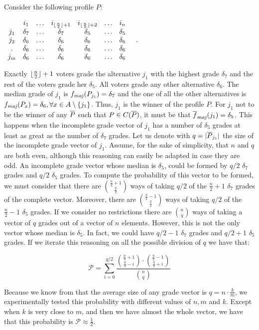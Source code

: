 	\begin{example} \normalfont
		Consider the following profile $P$:
		\begin{center}
			$
			\begin{array}{ccccccc}
					& i_1 & \dots & i_{\lfloor\frac{n}{2}\rfloor + 1} & i_{\lfloor\frac{n}{2}\rfloor + 2} & \dots & i_n \\
				j_1 & \delta_7 & \dots &\delta_7 & \delta_5 & \dots & \delta_5 \\
				j_2 & \delta_6 & \dots &\delta_6 & \delta_6 & \dots & \delta_6 \\
				. & \delta_6 & \dots &\delta_6 & \delta_6 & \dots & \delta_6 \\
				j_m & \delta_6 & \dots &\delta_6 & \delta_6 & \dots & \delta_6 \\
			\end{array} \quad.
			$
		\end{center}	
		Exactly $\lfloor\frac{n}{2}\rfloor + 1$ voters grade the alternative $j_1$ with the highest grade $\delta_7$ and the rest of the voters grade her $\delta_5$. All voters grade any other alternative $\delta_6$.
		The median grade of $j_1$ is $\fmaj(P_{j_1})=\delta_7$ and the one of all the other alternatives is $\fmaj(P_x)=\delta_6, \forall x \in A \setminus \{j_1\}$. Thus, $j_1$ is the winner of the profile $P$.
		For $j_1$ not to be the winner of any $\overline{P}$ such that $P \in C(\overline{P})$, it must be that $\fmajbar(j_1)=\delta_5$. This happens when the incomplete grade vector of $j_1$ has a number of $\delta_5$ grades at least as great as the number of $\delta_7$ grades. 
		Let us denote with $q=|\overline{P}_{j_1}|$ the size of the incomplete grade vector of $j_1$.
		Assume, for the sake of simplicity, that $n$ and $q$ are both even, although this reasoning can easily be adapted in case they are odd.
		An incomplete grade vector whose median is $\delta_5$, could be formed by $q/2$ $\delta_7$ grades and $q/2$ $\delta_5$ grades. To compute the probability of this vector to be formed, we must consider that there are $\binom{\frac{n}{2}+1}{ \frac{q}{2}}$ ways of taking $q/2$ of the $\frac{n}{2}+1$ $\delta_7$ grades of the complete vector. Moreover, there are $\binom{\frac{n}{2}-1}{ \frac{q}{2}}$ ways of taking $q/2$ of the $\frac{n}{2}-1$ $\delta_5$ grades. If we consider no restrictions there are $\binom{n}{q}$ ways of taking a vector of $q$ grades out of a vector of $n$ elements.
		However, this is not the only vector whose median is $\delta_5$. In fact, we could have $q/2-1$ $\delta_7$ grades and $q/2+1$ $\delta_5$ grades. If we iterate this reasoning on all the possible division of $q$ we have that:
	
		\[ \mathcal{P}= \sum_{i=0}^{q/2} \frac{\binom{\frac{n}{2}+1}{ \frac{q}{2}-i}\cdot\binom{\frac{n}{2}-1}{\frac{q}{2}+i}}{\binom{n}{q}} \]
		
		Because we know from  that the average size of any grade vector is $q=n\cdot\frac{k}{m}$, we experimentally tested  this probability with different values of $n,m$ and $k$. Except when $k$ is very close to $m$, and then we have almost the whole vector, we have that this probability is $\mathcal{P}\approx \frac{1}{2}$.
	\end{example}

